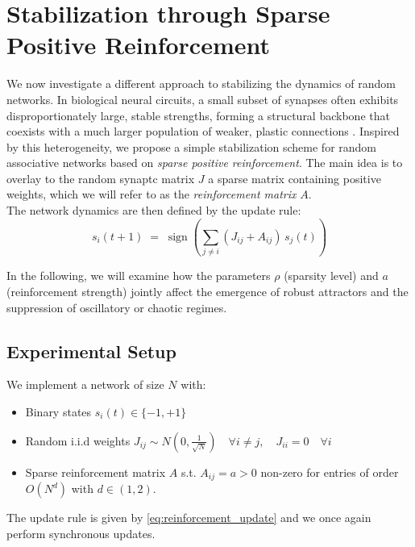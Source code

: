 \documentclass[a4paper,12pt]{report}
\begin{document}
\section{Stabilization through Sparse Positive Reinforcement}

We now investigate a different approach to stabilizing the dynamics of random networks.
In biological neural circuits, a small subset of synapses often exhibits 
disproportionately large, stable strengths, forming a structural backbone that 
coexists with a much larger population of weaker, plastic connections 
\cite{Scholl2020, Forsythe2013}.  
Inspired by this heterogeneity, we propose a simple stabilization scheme for 
random associative networks based on {\em sparse positive reinforcement}.
The main idea is to overlay to the random synaptc matrix \(J\) a sparse matrix 
containing positive weights, which we will refer to as the 
\emph{reinforcement matrix} $A$. \\
The network dynamics are then defined by the update rule:
\begin{equation}\label{eq:reinforcement_update}
  s_i(t+1) \;=\; \operatorname{sign}\left(\sum_{j\neq i} \left(J_{ij}+A_{ij}\right)
  \,s_j(t) \right)
\end{equation}

In the following, we will examine how the parameters \(\rho\) (sparsity level) and 
\(a\) (reinforcement strength) jointly affect the emergence of robust attractors and 
the suppression of oscillatory or chaotic regimes.

\subsection{Experimental Setup}
We implement a network of size \(N\) with:
\begin{itemize}
  \item Binary states \(s_i(t) \in \{-1,+1\}\)
  \item Random i.i.d weights 
  $J_{ij} \sim N(0,\frac{1}{ \sqrt N}) \hspace{1em} \forall i \neq j, \hspace{1em} J_{ii} = 0 \hspace{1em} \forall i$
  \item Sparse reinforcement matrix $A$ s.t. $A_{ij} = a > 0$ non-zero for entries of 
  order $O\left(N^d\right)$ with $d \in \left(1, 2\right)$.
\end{itemize}
The update rule is given by \eqref{eq:reinforcement_update} and we once again perform 
synchronous updates.
\end{document}
